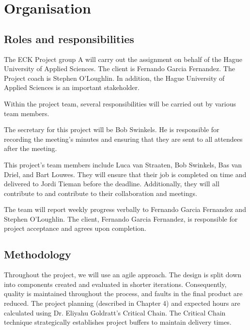\chapter{Organisation}
\label{ch:organisation}

\section{Roles and responsibilities}

The ECK Project group A will carry out the assignment on behalf of the Hague University of Applied Sciences. The client is Fernando Garcia Fernandez. The Project coach is Stephen O'Loughlin. In addition, the Hague University of Applied Sciences is an important stakeholder. 

Within the project team, several responsibilities will be carried out by various team members.


The secretary for this project will be Bob Swinkels. He is responsible for recording the meeting's minutes and ensuring that they are sent to all attendees after the meeting.

This project's team members include Luca van Straaten, Bob Swinkels, Bas van Driel, and Bart Louwes. They will ensure that their job is completed on time and delivered to Jordi Tieman before the deadline. Additionally, they will all contribute to and contribute to their collaboration and meetings.

The team will report weekly progress verbally to Fernando Garcia Fernandez and Stephen O'Loughlin. 
The client, Fernando Garcia Fernandez, is responsible for project acceptance and agrees upon completion.

\section{Methodology}

Throughout the project, we will use an agile approach. The design is split down into components created and evaluated in shorter iterations. Consequently, quality is maintained throughout the process, and faults in the final product are reduced.
The project planning (described in Chapter 4) and expected hours are calculated using Dr. Eliyahu Goldratt's Critical Chain. The Critical Chain technique strategically establishes project buffers to maintain delivery times.

